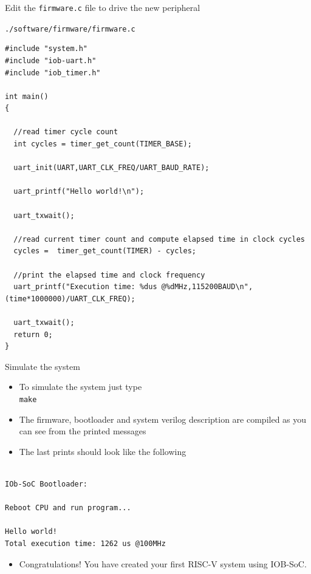 \documentclass [xcolor=svgnames, t] {beamer}
\begin{document}

\begin{frame}[fragile]{Edit the {\tt firmware.c} file to drive the new peripheral}

  {\tt ./software/firmware/firmware.c}
  \begin{tiny}
    \begin{lstlisting}
#include "system.h"
#include "iob-uart.h"
#include "iob_timer.h"

int main()
{ 

  //read timer cycle count
  int cycles = timer_get_count(TIMER_BASE);
  
  uart_init(UART,UART_CLK_FREQ/UART_BAUD_RATE);   

  uart_printf("Hello world!\n");

  uart_txwait();
  
  //read current timer count and compute elapsed time in clock cycles  
  cycles =  timer_get_count(TIMER) - cycles;

  //print the elapsed time and clock frequency
  uart_printf("Execution time: %dus @%dMHz,115200BAUD\n",(time*1000000)/UART_CLK_FREQ);

  uart_txwait();
  return 0;
}
\end{lstlisting}
\end{tiny}
\end{frame}


\begin{frame}[fragile]{Simulate the system}

\begin{itemize}
\item To simulate the system just type\\
  {\tt make} 
\item The firmware, bootloader and system verilog description are compiled as you can see from the printed messages
\item The last prints should look like the following
\end{itemize}

\begin{tiny}
\begin{lstlisting}

IOb-SoC Bootloader:

Reboot CPU and run program...

Hello world!
Total execution time: 1262 us @100MHz
\end{lstlisting}
\end{tiny}

\begin{itemize}
\item Congratulations! You have created your first RISC-V system using IOB-SoC.\\
\end{itemize}

\end{frame}
\end{document}
